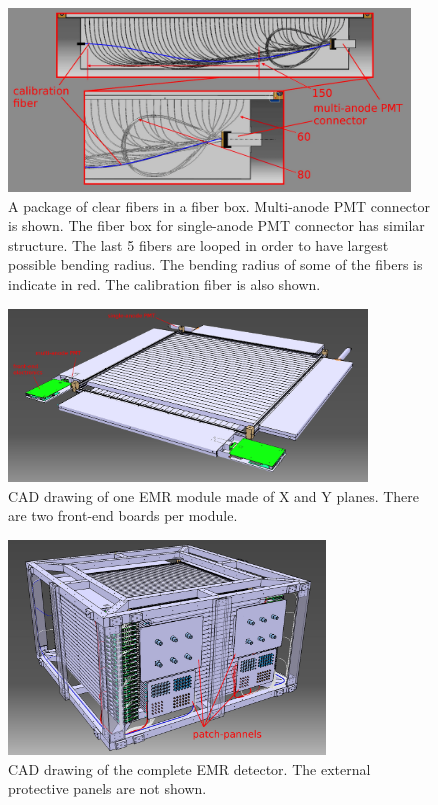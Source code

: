 \documentclass[a4paper,11pt]{article}
\begin{document}
\begin{figure}[ht]
 \centering
 \includegraphics[width=0.95\textwidth]{./clear_fiber_package}
 \caption[A package of clear fibers in a fiber box]{ A package of clear fibers in a fiber box. Multi-anode PMT connector is shown.
 The fiber box for single-anode PMT connector has similar structure. The last 5 fibers are looped in order to have largest possible
 bending radius. The bending radius of some of the fibers is indicate in red. The calibration fiber is also shown. }
 \label{fig:clear_fiber_package}
\end{figure}

\begin{figure}[htb]
 \centering
 \includegraphics[width=0.85\textwidth]{./emr_module}
 \caption[CAD drawing of one EMR module]{CAD drawing of one EMR module made of X and Y planes. There are two front-end boards per module.}
 \label{fig:emr_module}
\end{figure}
\begin{figure}[htp!]
 \centering
 \includegraphics[width=0.75\textwidth]{./emr_cad_model_1}
 \caption[CAD drawing of the EMR detector]{CAD drawing of the complete EMR detector. The external protective panels are not shown.}
 \label{fig:emr_full_cad_model}
\end{figure}
\end{document}

